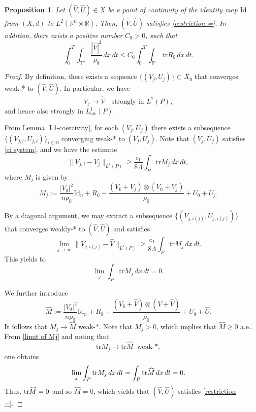 \documentclass[12pt,reqno]{amsart}
\newtheorem{Proposition}{Proposition}[section]
\theoremstyle{definition}
\theoremstyle{remark}
\numberwithin{equation}{section}
\newcommand{\R}{{\mathbb R}}
\newcommand{\tr}{{\rm tr}}
\newcommand{\id}{\mathrm{Id}}
\newcommand{\trace}{\mathrm{tr}}
\begin{document}
\begin{Proposition}
\label{proposition points}
Let $(\widehat{V},\widehat{U})\in X$ be a point of continuity of the identity map $\id$ from $(X,d)$ to $L^2(\R^n\times\R)$. Then, $(\widehat{V},\widehat{U})$ satisfies \eqref{restriction =}. In addition, there exists a positive number $C_0>0$, such that 
 $$
 \int_0^T\int_{\mathbb{T}^n}\frac{|\widehat{V}|^2}{\rho_0}\,dx\,dt\leq C_0\int_0^T\int_{\mathbb{T}^n} \trace R_0\,dx\,dt.
 $$
\end{Proposition}
\begin{proof}
By definition, there exists a sequence $\{(V_j, U_j)\} \subset X_0$ that converges weak-* to $(\widehat{V}, \widehat{U})$. In particular, we have
\[
V_j \to \widehat{V} \quad \text{strongly in } L^2(P),
\]
and hence also strongly in $L^1_{\text{loc}}(P)$.

From Lemma \ref{L1-coercivity}, for each $(V_j, U_j)$ there exists a subsequence $\{(V_{j,i}, U_{j,i})\}_{i\in \mathbb{N}}$ converging weak-* to $(V_j, U_j)$. Note that $(V_j, U_j)$ satisfies \eqref{ci system}, and we have the estimate
\[
\|V_{j,i} - V_j\|_{L^1(P)} \geq \frac{c_1}{8\Lambda} \int_P \trace M_j \, dx\,dt,
\]
where $M_j$ is given by
\[
M_j := \frac{|V_0|^2}{n\rho_0} \id_n + R_0 - \frac{(V_0 + V_j) \otimes (V_0 + V_j)}{\rho_0} + U_0 + U_j.
\]

By a diagonal argument, we may extract a subsequence $\{(V_{j,i(j)}, U_{j,i(j)})\}$ that converges weakly-* to $(\widehat{V}, \widehat{U})$ and satisfies
\[
\lim_{j \to \infty} \|V_{j,i(j)} - \widehat{V}\|_{L^1(P)} \geq \frac{c_1}{8\Lambda} \int_P \trace M_j \, dx\,dt.
\]
  This yields to 
\begin{equation}
  \label{limit of Mj}
  \lim_{j}\int_{P}\trace M_j\,dx\,dt=0.
\end{equation}
  
We further introduce  
\begin{equation*}
  \widehat{M} := \frac{|V_0|^2}{n\rho_0} \id_n +R_0-\frac{(V_0+\widehat{V})\otimes (V+\widehat{V})}{\rho_0}+U_0+\widehat{U}.
  \end{equation*}
It follows that $M_j\to \widehat{M}$ weak-$*$. Note that $M_j>0$, which implies that $\widehat{M}\geq 0$ a.e.. From \eqref{limit of Mj} and noting that 
$$
\trace M_j\to \trace \widehat{M}\;\;\text{weak-}*,
$$
one obtains  
\begin{equation*}
  \lim_{j}\int_{P} \trace M_j\,dx\,dt = \int_P\tr \widehat{M}\,dx\,dt=0.
\end{equation*}
   Thus, $\tr \widehat{M}=0$ and so $\widehat{M}=0$, which yields that $(\widehat{V},\widehat{U})$ satisfies  \eqref{restriction =}.
    

\end{proof}
\end{document}

